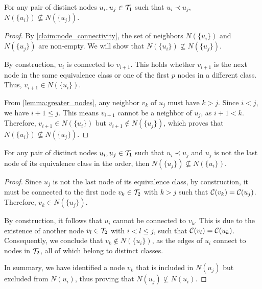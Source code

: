 \begin{lemma} \label{lemma:distinct_neighborhoods}
    For any pair of distinct nodes $u_i, u_j \in \mathcal{T}_{1}$ such that $u_i \prec u_j$, $N(\{u_i\}) \not\subseteq N(\{u_j\})$.
\end{lemma}
\begin{proof}
    By \cref{claim:node_connectivity}, the set of neighbors $N(\{u_i\})$ and $N(\{u_j\})$ are non-empty. We will show that $N(\{u_i\}) \not\subseteq N(\{u_j\})$. 
    
    By construction, $u_i$ is connected to $v_{i+1}$. This holds whether $v_{i+1}$ is the next node in the same equivalence class or one of the first $p$ nodes in a different class. Thus, $v_{i+1} \in N(\{u_i\})$.

    From \cref{lemma:greater_nodes}, any neighbor $v_k$ of $u_j$ must have $k > j$. Since $i < j$, we have $i+1 \leq j$.
    This means $v_{i+1}$ cannot be a neighbor of $u_j$, as $i + 1 < k$. Therefore, $v_{i+1} \in N(\{u_i\})$ but $v_{i+1} \notin N(\{u_j\})$, which proves that $N(\{u_i\}) \not\subseteq N(\{u_j\})$.
\end{proof}

\begin{lemma} \label{lemma:distinct_neighborhoods_2}
    For any pair of distinct nodes $u_i, u_j \in \mathcal{T}_{1}$ such that $u_i \prec u_j$ and $u_j$ is not the last node of its equivalence class in the order, then $N(\{u_j\}) \not\subseteq N(\{u_i\})$.
\end{lemma}
\begin{proof}
    Since $u_j$ is not the last node of its equivalence class, by construction, it must be connected to the first node $v_k \in \mathcal{T}_{2}$ with $k > j$ such that $\mathcal{C}(v_k) = \mathcal{C}(u_j)$. Therefore, $v_k \in N(\{u_j\})$.

    By construction, it follows that $u_i$ cannot be connected to $v_k$. This is due to the existence of another node $v_l \in \mathcal{T}_{2}$ with $i < l \leq j$, such that $\mathcal{C}(v_l) = \mathcal{C}(u_k)$. Consequently, we conclude that $v_k \notin N(\{u_i\})$, as the edges of $u_i$ connect to nodes in $\mathcal{T}_{2}$, all of which belong to distinct classes.

    In summary, we have identified a node $v_k$ that is included in $N({u_j})$ but excluded from $N({u_i})$, thus proving that $N({u_j}) \not\subseteq N({u_i})$.
\end{proof}

